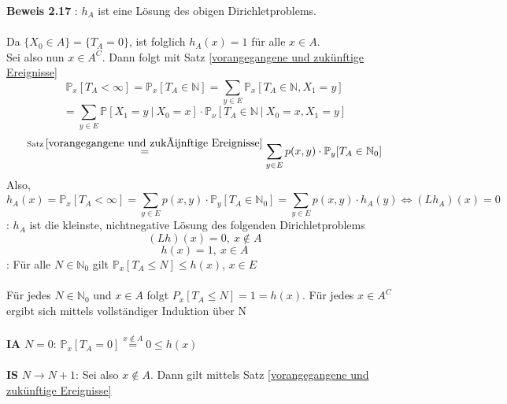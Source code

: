 \textbf{Beweis 2.17}
: $h_{A}$ ist eine Lösung des obigen Dirichletproblems.
\\
\\
Da $\lbrace X_{0} \in A \rbrace = \lbrace T_{A} = 0 \rbrace$, ist folglich $h_{A}(x) = 1$ für alle $x \in A$.
\\
Sei also nun $x \in A^{C}$. Dann folgt mit Satz \ref{vorangegangene und zukünftige Ereignisse}
\begin{equation*}
\mathbb{P}_{x}[T_{A} < \infty] = \mathbb{P}_{x}[T_{A} \in \mathbb{N}] = \sum_{y \in E} \mathbb{P}_{x}[T_{A} \in \mathbb{N}, X_{1} = y]
\end{equation*}
\begin{equation*}
= \sum_{y \in E} \mathbb{P}[X_{1} = y \: | \: X_{0} = x] \cdot \mathbb{P}_{\nu}[T_{A} \in \mathbb{N} \: | \: X_{0} = x, X_{1} = y]
\end{equation*}
\begin{equation*}
\stackrel{\mathrm{Satz} \: \ref{vorangegangene und zukünftige Ereignisse}}{=} \sum_{y \in E} p(x,y) \cdot \mathbb{P}_{y}[T_{A} \in \mathbb{N}_{0}]
\end{equation*}
Also,
\begin{equation*}
h_{A}(x) = \mathbb{P}_{x}[T_{A} < \infty] = \sum_{y \in E} p(x,y) \cdot \mathbb{P}_{y}[T_{A} \in \mathbb{N}_{0}] = \sum_{y \in E} p(x,y) \cdot h_{A}(y) \Leftrightarrow (Lh_{A})(x) = 0
\end{equation*}
: $h_{A}$ ist die kleinste, nichtnegative Lösung des folgenden Dirichletproblems
\begin{equation*}
(Lh)(x) = 0, \: x \notin A
\end{equation*}
\begin{equation*}
h(x) = 1, \: x \in A
\end{equation*}
: Für alle $N \in \mathbb{N}_{0}$ gilt $\mathbb{P}_{x}[T_{A} \leq N] \leq h(x)$, $x \in E$
\\
\\
Für jedes $N \in \mathbb{N}_{0}$ und $x \in A$ folgt $P_{x}[T_{A} \leq N] = 1 = h(x)$. Für jedes $x \in A^{C}$ ergibt sich mittels vollständiger Induktion über N
\\
\\
\textbf{IA} $N=0$: $\mathbb{P}_{x}[T_{A} = 0] \stackrel{x \notin A}{=}0 \leq h(x)$
\\
\\
\textbf{IS} $N \to N+1$: Sei also $x \notin A$. Dann gilt mittels Satz \ref{vorangegangene und zukünftige Ereignisse}
